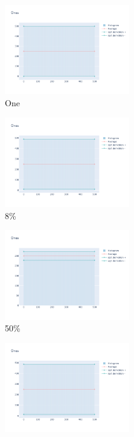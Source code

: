 \documentclass[12pt, fleqn]{report}                             %
\theoremstyle{break}                                            %
\begin{document}
      \begin{figure}[ht!]
        \centering
        \begin{subfigure}[b]{0.4\linewidth}
          \includegraphics[width=0.6\textwidth]{Images/23/dia-a.png}
          \caption{One}
        \end{subfigure}
        \begin{subfigure}[b]{0.4\linewidth}
          \includegraphics[width=0.6\textwidth]{Images/23/dia-b.png}
          \caption{8\%}
        \end{subfigure}
        \begin{subfigure}[b]{0.4\linewidth}
          \includegraphics[width=0.6\textwidth]{Images/23/dia-c.png}
          \caption{50\%}
        \end{subfigure}
        \begin{subfigure}[b]{0.4\linewidth}
          \includegraphics[width=0.6\textwidth]{Images/23/dia-d.png}

\end{subfigure}
\end{figure}
\end{document}
